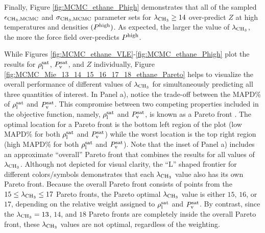 \documentclass[preprint,letterpaper,floatfix,citeautoscript,aip,jcp]{revtex4-1}
\begin{document}
Finally, Figure \ref{fig:MCMC_ethane_Phigh} demonstrates that all of the sampled $\epsilon_{\rm CH_3, MCMC}$ and $\sigma_{\rm CH_3, MCMC}$ parameter sets for $\lambda_{\rm CH_3} \ge 14$ over-predict $Z$ at high temperatures and densities $(P^{\rm high})$. As expected, the larger the value of $\lambda_{\rm CH_3}$, the 
more 
the force field over-predicts $P^{\rm high}$.

While Figures \ref{fig:MCMC_ethane_VLE}-\ref{fig:MCMC_ethane_Phigh} plot the results for $\rho_{\rm l}^{\rm sat}$, $P_{\rm v}^{\rm sat}$, and $Z$ individually, Figure \ref{fig:MCMC_Mie_13_14_15_16_17_18_ethane_Pareto} helps to visualize the overall performance of different values of $\lambda_{\rm CH_3}$ for simultaneously predicting all three quantities of interest. 
In Panel a), notice the trade-off between the MAPD\% of $\rho_{\rm l}^{\rm sat}$ and $P_{\rm v}^{\rm sat}$. This compromise between two competing properties included in the objective function, namely, $\rho_{\rm l}^{\rm sat}$ and $P_{\rm v}^{\rm sat}$, is known as a Pareto front \cite{Pareto_Deriv,Pareto_LJPQ,Pareto_ST}. The optimal location for a Pareto front is the bottom left region of the plot (low MAPD\% for both $\rho_{\rm l}^{\rm sat}$ and $P_{\rm v}^{\rm sat}$) while the worst location is the top right region (high MAPD\% for both $\rho_{\rm l}^{\rm sat}$ and $P_{\rm v}^{\rm sat}$). Note that the inset of Panel a) includes an approximate ``overall'' Pareto front that combines the results for all values of $\lambda_{\rm CH_3}$. Although not depicted for visual clarity, the ``L'' shaped frontier for different colors/symbols demonstrates that each $\lambda_{\rm CH_3}$ value also has its own Pareto front. Because the overall Pareto front consists of points from the $15 \leq \lambda_{\rm CH_3} \leq 17$ Pareto fronts, the Pareto optimal $\lambda_{\rm CH_3}$ value is either $15$, $16$, or $17$, depending on the relative weight assigned to $\rho_{\rm l}^{\rm sat}$ and $P_{\rm v}^{\rm sat}$. By contrast, since the $\lambda_{\rm CH_3} = 13$, $14$, and $18$ Pareto fronts are completely inside the overall Pareto front, these $\lambda_{\rm CH_3}$ values are not optimal, regardless of the weighting.
\end{document}
